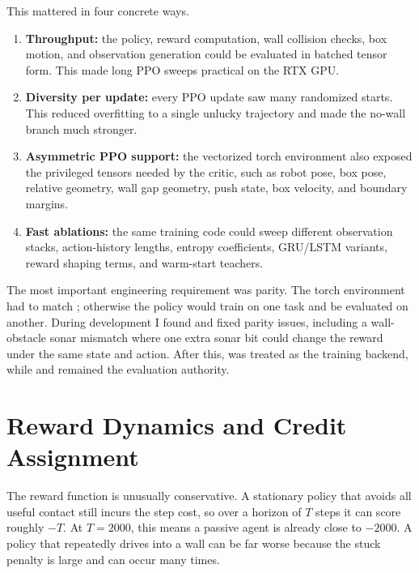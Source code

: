\documentclass[11pt]{article}
\begin{document}
This mattered in four concrete ways.
\begin{enumerate}[leftmargin=1.5em]
  \item \textbf{Throughput:} the policy, reward computation, wall collision checks, box
  motion, and observation generation could be evaluated in batched tensor form. This
  made long PPO sweeps practical on the RTX GPU.
  \item \textbf{Diversity per update:} every PPO update saw many randomized starts. This
  reduced overfitting to a single unlucky trajectory and made the no-wall branch much
  stronger.
  \item \textbf{Asymmetric PPO support:} the vectorized torch environment also exposed
  the privileged tensors needed by the critic, such as robot pose, box pose, relative
  geometry, wall gap geometry, push state, box velocity, and boundary margins.
  \item \textbf{Fast ablations:} the same training code could sweep different observation
  stacks, action-history lengths, entropy coefficients, GRU/LSTM variants, reward
  shaping terms, and warm-start teachers.
\end{enumerate}

The most important engineering requirement was parity. The torch environment had to
match ; otherwise the policy would train on one task and be evaluated on
another. During development I found and fixed parity issues, including a wall-obstacle
sonar mismatch where one extra sonar bit could change the reward under the same state
and action. After this,  was treated as the training backend, while
 and  remained the evaluation authority.

\section{Reward Dynamics and Credit Assignment}

The reward function is unusually conservative. A stationary policy that avoids all useful
contact still incurs the step cost, so over a horizon of \(T\) steps it can score roughly
\(-T\). At \(T=2000\), this means a passive agent is already close to \(-2000\). A
policy that repeatedly drives into a wall can be far worse because the stuck penalty is
large and can occur many times.
\end{document}
